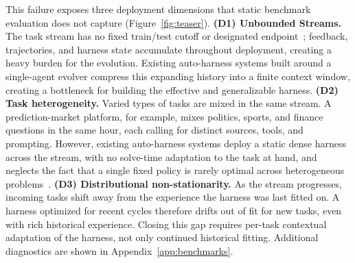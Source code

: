 This failure exposes three deployment dimensions that static benchmark evaluation does not capture (Figure~\ref{fig:teaser}). \textbf{(D1) Unbounded Streams.} The task stream has no fixed train/test cutoff or designated endpoint~\cite{karten2026continual,wang2023voyager}; feedback, trajectories, and harness state accumulate throughout deployment, creating a heavy burden for the evolution.
{Existing auto-harness systems built around a single-agent evolver compress this expanding history into a finite context window, creating a bottleneck for building the effective and generalizable harness. } 
\textbf{(D2) Task heterogeneity.} 
Varied types of tasks are mixed in the same stream. A prediction-market platform, for example, mixes politics, sports, and finance questions in the same hour, each calling for distinct sources, tools, and prompting. However, existing auto-harness systems deploy a static dense harness across the stream, with no solve-time adaptation to the task at hand, and neglects the fact that a single fixed policy is rarely optimal across heterogeneous problems~\cite{miao2025reinforcement}.
\textbf{(D3) Distributional non-stationarity.} As the stream progresses, incoming tasks shift away from the experience the harness was last fitted on. A harness optimized for recent cycles therefore drifts out of fit for new tasks, even with rich historical experience. Closing this gap requires per-task contextual adaptation of the harness, not only continued historical fitting. Additional diagnostics are shown in Appendix~\ref{app:benchmarks}.



